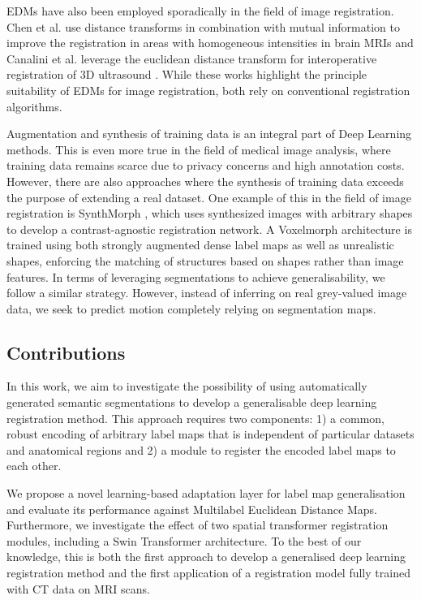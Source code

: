 EDMs have also been employed sporadically in the field of image registration. Chen et al. use distance transforms in combination with mutual information to improve the registration in areas with homogeneous intensities in brain MRIs \citep{Chen2011DistanceMRI} and Canalini et al. leverage the euclidean distance transform for interoperative registration of 3D ultrasound \citep{canalini_registration_2019_US}. While these works highlight the principle suitability of EDMs for image registration, both rely on conventional registration algorithms. 

Augmentation and synthesis of training data is an integral part of Deep Learning methods. This is even more true in the field of medical image analysis, where training data remains scarce due to privacy concerns and high annotation costs. However, there are also approaches where the synthesis of training data exceeds the purpose of extending a real dataset. One example of this in the field of image registration is SynthMorph \citep{hoffmann2022synthmorph}, which uses synthesized images with arbitrary shapes to develop a contrast-agnostic registration network. A Voxelmorph architecture is trained using both strongly augmented dense label maps as well as unrealistic shapes, enforcing the matching of structures based on shapes rather than image features. In terms of leveraging segmentations to achieve generalisability, we follow a similar strategy. However, instead of inferring on real grey-valued image data, we seek to predict motion completely relying on segmentation maps. %

\subsection*{Contributions}
In this work, we aim to investigate the possibility of using automatically generated semantic segmentations to develop a generalisable deep learning registration method. This approach requires two components: 1) a common, robust encoding of arbitrary label maps that is independent of particular datasets and anatomical regions and 2) a module to register the encoded label maps to each other. 

We propose a novel learning-based adaptation layer for label map generalisation and evaluate its performance against Multilabel Euclidean Distance Maps. Furthermore, we investigate the effect of two spatial transformer registration modules, including a Swin Transformer architecture. To the best of our knowledge, this is both the first approach to develop a generalised deep learning registration method and the first application of a registration model fully trained with CT data on MRI scans.

